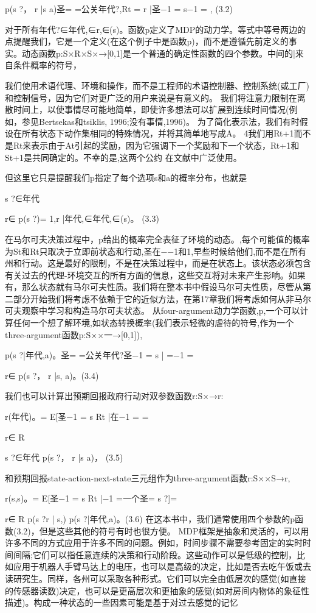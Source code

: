 p(s ?， r |s a)圣= =公关{年代?,Rt = r |圣−1 = s−1 = }, 					(3.2)

对于所有年代?∈年代,∈r,∈(s)。函数p定义了MDP的动力学。等式中等号两边的点提醒我们，它是一个定义(在这个例子中是函数p)，而不是遵循先前定义的事实。动态函数p:S×R×S×→[0,1]是一个普通的确定性函数的四个参数。中间的|来自条件概率的符号，

我们使用术语代理、环境和操作，而不是工程师的术语控制器、控制系统(或工厂)和控制信号，因为它们对更广泛的用户来说是有意义的。
我们将注意力限制在离散时间上，以使事情尽可能地简单，即使许多想法可以扩展到连续时间情况(例如，参见Bertsekas和tsiklis, 1996;没有事情,1996)。
为了简化表示法，我们有时假设在所有状态下动作集相同的特殊情况，并将其简单地写成A。
4我们用Rt+1而不是Rt来表示由于At引起的奖励，因为它强调下一个奖励和下一个状态，Rt+1和St+1是共同确定的。不幸的是,这两个公约
在文献中广泛使用。

但这里它只是提醒我们p指定了每个选项s和a的概率分布，也就是

s ?∈年代

r∈
p(s ?)= 1,r |年代,∈年代,∈(s)。 					(3.3)


在马尔可夫决策过程中，p给出的概率完全表征了环境的动态。,每个可能值的概率为St和Rt只取决于立即前状态和行动,圣在−−1和1,早些时候给他们,而不是在所有州和行动。这是最好的限制，不是在决策过程中，而是在状态上。该状态必须包含有关过去的代理-环境交互的所有方面的信息，这些交互将对未来产生影响。如果有，那么状态就有马尔可夫性质。我们将在整本书中假设马尔可夫性质，尽管从第二部分开始我们将考虑不依赖于它的近似方法，在第17章我们将考虑如何从非马尔可夫观察中学习和构造马尔可夫状态。
从four-argument动力学函数,p,一个可以计算任何一个想了解环境,如状态转换概率(我们表示轻微的虐待的符号,作为一个three-argument函数p:S××一→[0,1]),


p(s ?|年代,a)。圣= =公关{年代?圣−1 = s | } =−1 =

r∈
p(s ?， r |s, a)。(3.4)

我们也可以计算出预期回报政府行动对双参数函数r:S×→r:

r(年代)。= E[圣−1 = s Rt |在−1 = =

r∈
R

s ?∈年代
p(s ?， r |s a)， (3.5)

和预期回报state-action-next-state三元组作为three-argument函数r:S××S→r,

r(s,s)。= E[圣−1 = s Rt |−1 =一个圣= s ?]=

r∈
R
p(s ?r | s,)
p(s ?|年代,a)。(3.6)
在这本书中，我们通常使用四个参数的p函数(3.2)，但是这些其他的符号有时也很方便。
MDP框架是抽象和灵活的，可以用许多不同的方式应用于许多不同的问题。例如，时间步骤不需要参考固定的实时时间间隔;它们可以指任意连续的决策和行动阶段。这些动作可以是低级的控制，比如应用于机器人手臂马达上的电压，也可以是高级的决定，比如是否去吃午饭或去读研究生。同样，各州可以采取各种形式。它们可以完全由低层次的感觉(如直接的传感器读数)决定，也可以是更高层次和更抽象的感觉(如对房间内物体的象征性描述)。构成一种状态的一些因素可能是基于对过去感觉的记忆

